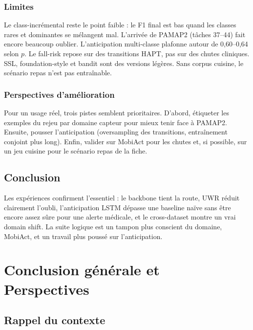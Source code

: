 \documentclass[a4paper,12pt]{report}
\begin{document}
\subsection{Limites}

Le class-incrémental reste le point faible : le F1 final est bas quand les
classes rares et dominantes se mélangent mal. L'arrivée de PAMAP2 (tâches
37--44) fait encore beaucoup oublier. L'anticipation multi-classe plafonne
autour de 0,60--0,64 selon $p$. Le fall-risk repose sur des transitions
HAPT, pas sur des chutes cliniques. SSL, foundation-style et bandit sont des
versions légères. Sans corpus cuisine, le scénario repas n'est pas entraînable.

\subsection{Perspectives d'amélioration}

Pour un usage réel, trois pistes semblent prioritaires. D'abord, étiqueter
les exemples du rejeu par domaine capteur pour mieux tenir face à PAMAP2.
Ensuite, pousser l'anticipation (oversampling des transitions, entraînement
conjoint plus long). Enfin, valider sur MobiAct pour les chutes et, si
possible, sur un jeu cuisine pour le scénario repas de la fiche.

\section{Conclusion}

Les expériences confirment l'essentiel : le backbone tient la route, UWR
réduit clairement l'oubli, l'anticipation LSTM dépasse une baseline naïve
sans être encore assez sûre pour une alerte médicale, et le cross-dataset
montre un vrai domain shift. La suite logique est un tampon plus conscient
du domaine, MobiAct, et un travail plus poussé sur l'anticipation.




\clearpage
\chapter*{Conclusion générale et Perspectives}
\label{sec:conclusion}

\section{Rappel du contexte}
\end{document}
